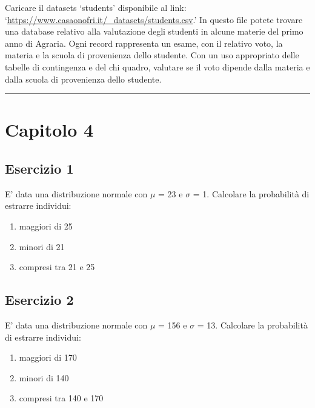 \documentclass[a4paper,12pt,oneside]{book}
\providecommand{\tightlist}{%
  \setlength{\itemsep}{0pt}\setlength{\parskip}{0pt}}
\begin{document}
Caricare il datasets `students' disponibile al link: `\url{https://www.casaonofri.it/_datasets/students.csv}.' In questo file potete trovare una database relativo alla valutazione degli studenti in alcune materie del primo anno di Agraria. Ogni record rappresenta un esame, con il relativo voto, la materia e la scuola di provenienza dello studente. Con un uso appropriato delle tabelle di contingenza e del chi quadro, valutare se il voto dipende dalla materia e dalla scuola di provenienza dello studente.

\begin{center}\rule{0.5\linewidth}{0.5pt}\end{center}

\hypertarget{capitolo-4}{%
\section{Capitolo 4}\label{capitolo-4}}

\hypertarget{esercizio-1-2}{%
\subsection{Esercizio 1}\label{esercizio-1-2}}

E' data una distribuzione normale con \(\mu\) = 23 e \(\sigma\) = 1. Calcolare la probabilità di estrarre individui:

\begin{enumerate}
\def\labelenumi{\arabic{enumi}.}
\tightlist
\item
  maggiori di 25
\item
  minori di 21
\item
  compresi tra 21 e 25
\end{enumerate}

\hypertarget{esercizio-2-2}{%
\subsection{Esercizio 2}\label{esercizio-2-2}}

E' data una distribuzione normale con \(\mu\) = 156 e \(\sigma\) = 13. Calcolare la probabilità di estrarre individui:

\begin{enumerate}
\def\labelenumi{\arabic{enumi}.}
\tightlist
\item
  maggiori di 170
\item
  minori di 140
\item
  compresi tra 140 e 170
\end{enumerate}
\end{document}
